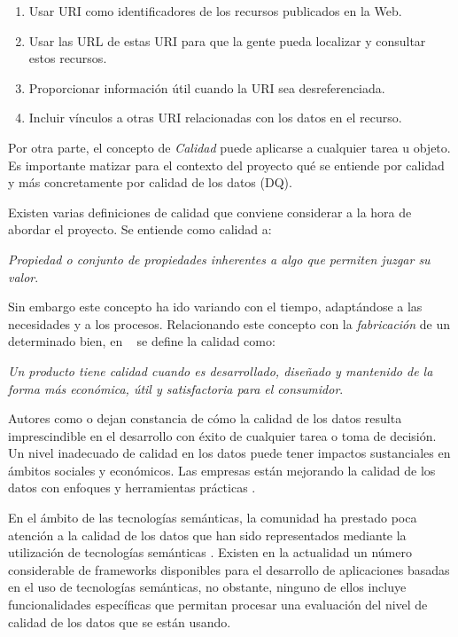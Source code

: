 \begin{enumerate}
\item{Usar \acs{URI} como identificadores de los recursos publicados en la Web.}
\item{Usar las URL de estas \acs{URI} para que la gente pueda localizar y consultar
  estos recursos.}
\item{Proporcionar información útil cuando la \acs{URI} sea desreferenciada.}
\item{Incluir vínculos a otras \acs{URI} relacionadas con los datos en el recurso.}
\end{enumerate}


Por otra parte, el concepto de \textit{Calidad} puede aplicarse a cualquier tarea u objeto. Es
importante matizar para el contexto del proyecto qué se entiende por calidad y
más concretamente por calidad de los datos (\acs{DQ}). 


Existen varias definiciones de calidad que conviene considerar a la hora de
abordar el proyecto. Se entiende como calidad a: 

\textit{Propiedad o conjunto de propiedades
  inherentes a algo que permiten juzgar su valor}.

Sin embargo este concepto ha ido variando con el tiempo, adaptándose a las
necesidades y a los procesos. Relacionando este concepto con la
\textit{fabricación} de un determinado bien, en ~\cite{ISHI} se define la calidad
como: 

\textit{Un producto tiene calidad cuando es desarrollado, diseñado y mantenido
  de la forma más económica, útil y satisfactoria para el consumidor}. 


Autores como \cite{conf/webist/CaballeroMACC} o \cite{conf/ekaw/FurberH10} dejan constancia de cómo la calidad de los datos resulta imprescindible en el
desarrollo con éxito de cualquier tarea o toma de decisión. Un nivel inadecuado de calidad en los datos puede tener impactos sustanciales en ámbitos
sociales y económicos. Las empresas están mejorando la calidad de los datos con
enfoques y herramientas prácticas \cite{Wang:1996:BAD:1189570.1189572}. 

En el ámbito de las tecnologías semánticas, la comunidad ha prestado poca
atención a la calidad de los datos que han sido representados mediante la
utilización de tecnologías semánticas
\cite{conf/ekaw/FurberH10}. Existen en la actualidad un número considerable de
frameworks disponibles para el desarrollo de aplicaciones basadas en el uso de
tecnologías semánticas, no obstante, ninguno de ellos incluye funcionalidades
específicas que permitan procesar una evaluación del nivel de calidad de los
datos que se están usando.

